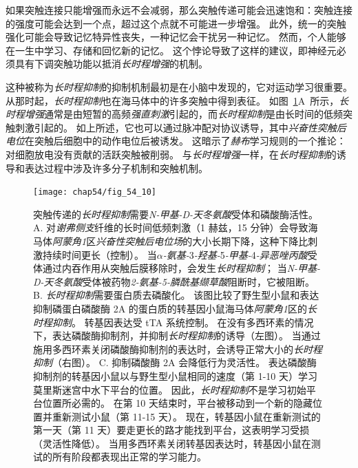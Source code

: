 如果突触连接只能增强而永远不会减弱，那么突触传递可能会迅速饱和：突触连接的强度可能会达到一个点，超过这个点就不可能进一步增强。
此外，统一的突触强化可能会导致记忆特异性丧失，一种记忆会干扰另一种记忆。
然而，个人能够在一生中学习、存储和回忆新的记忆。
这个悖论导致了这样的建议，即神经元必须具有下调突触功能以抵消\textit{长时程增强}的机制。


这种被称为\textit{长时程抑制}的抑制机制最初是在小脑中发现的，它对运动学习很重要。
从那时起，\textit{长时程抑制}也在海马体中的许多突触中得到表征。
如图~\ref{fig:54_10}A~所示，\textit{长时程增强}通常是由短暂的高频\textit{强直刺激}引起的，而\textit{长时程抑制}是由长时间的低频突触刺激引起的。
如上所述，它也可以通过脉冲配对协议诱导，其中\textit{兴奋性突触后电位}在突触后细胞中的动作电位后被诱发。
这暗示了\textit{赫布}学习规则的一个推论：对细胞放电没有贡献的活跃突触被削弱。
与\textit{长时程增强}一样，在\textit{长时程抑制}的诱导和表达过程中涉及许多分子机制和突触机制。


\begin{figure}[htbp]
	\centering
	\texttt{[image: chap54/fig\_54\_10]}
	\caption{突触传递的\textit{长时程抑制}需要\textit{N-甲基-D-天冬氨酸}受体和磷酸酶活性。
		A. 对\textit{谢弗侧支}纤维的长时间低频刺激（1 赫兹，15 分钟）会导致海马体\textit{阿蒙角1}区\textit{兴奋性突触后电位场}的大小长期下降，这种下降比刺激持续时间更长（控制）。
		当\textit{$\alpha$-氨基-}3\textit{-羟基-}5\textit{-甲基-}4\textit{-异恶唑丙酸}受体通过内吞作用从突触后膜移除时，会发生\textit{长时程抑制}；
		当\textit{N-甲基-D-天冬氨酸}受体被药物\textit{2-氨基-5-膦酰基缬草酸}阻断时，它被阻断\cite{dudek1992homosynaptic}。
		B. \textit{长时程抑制}需要蛋白质去磷酸化。
		该图比较了野生型小鼠和表达抑制磷蛋白磷酸酶 2A 的蛋白质的转基因小鼠海马体\textit{阿蒙角1}区的\textit{长时程抑制}。
		转基因表达受 tTA 系统控制。
		在没有多西环素的情况下，表达磷酸酶抑制剂，并抑制\textit{长时程抑制}的诱导（左图）。
		当通过施用多西环素关闭磷酸酶抑制剂的表达时，会诱导正常大小的\textit{长时程抑制}（右图）。
		C. 抑制磷酸酶 2A 会降低行为灵活性。
		表达磷酸酶抑制剂的转基因小鼠以与野生型小鼠相同的速度（第 1-10 天）学习莫里斯迷宫中水下平台的位置。
		因此，\textit{长时程抑制}不是学习初始平台位置所必需的。
		在第 10 天结束时，平台被移动到一个新的隐藏位置并重新测试小鼠（第 11-15 天）。
		现在，转基因小鼠在重新测试的第一天（第 11 天）要走更长的路才能找到平台，这表明学习受损（灵活性降低）。
		当用多西环素关闭转基因表达时，转基因小鼠在测试的所有阶段都表现出正常的学习能力\cite{nicholls2008transgenic}。}
	\label{fig:54_10}
\end{figure}


